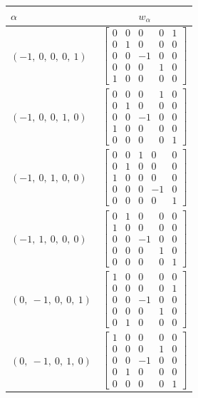 \documentclass[11pt]{article}
\newcommand{\noi}{\noindent}
\theoremstyle{definition}
\begin{document}
\noi \noindent \begin{longtable}{|l|c|}
    \hline
    $\alpha$ & $w_\alpha$ \\
    \hline
    \endhead
    $\left( -1, \  0, \  0, \  0, \  1\right)$ & ${\left[\begin{matrix}0 & 0 & 0 & 0 & 1\\0 & 1 & 0 & 0 & 0\\0 & 0 & -1 & 0 & 0\\0 & 0 & 0 & 1 & 0\\1 & 0 & 0 & 0 & 0\end{matrix}\right]}$ \\
    \hline
    $\left( -1, \  0, \  0, \  1, \  0\right)$ & ${\left[\begin{matrix}0 & 0 & 0 & 1 & 0\\0 & 1 & 0 & 0 & 0\\0 & 0 & -1 & 0 & 0\\1 & 0 & 0 & 0 & 0\\0 & 0 & 0 & 0 & 1\end{matrix}\right]}$ \\
    \hline
    $\left( -1, \  0, \  1, \  0, \  0\right)$ & ${\left[\begin{matrix}0 & 0 & 1 & 0 & 0\\0 & 1 & 0 & 0 & 0\\1 & 0 & 0 & 0 & 0\\0 & 0 & 0 & -1 & 0\\0 & 0 & 0 & 0 & 1\end{matrix}\right]}$ \\
    \hline
    $\left( -1, \  1, \  0, \  0, \  0\right)$ & ${\left[\begin{matrix}0 & 1 & 0 & 0 & 0\\1 & 0 & 0 & 0 & 0\\0 & 0 & -1 & 0 & 0\\0 & 0 & 0 & 1 & 0\\0 & 0 & 0 & 0 & 1\end{matrix}\right]}$ \\
    \hline
    $\left( 0, \  -1, \  0, \  0, \  1\right)$ & ${\left[\begin{matrix}1 & 0 & 0 & 0 & 0\\0 & 0 & 0 & 0 & 1\\0 & 0 & -1 & 0 & 0\\0 & 0 & 0 & 1 & 0\\0 & 1 & 0 & 0 & 0\end{matrix}\right]}$ \\
    \hline
    $\left( 0, \  -1, \  0, \  1, \  0\right)$ & ${\left[\begin{matrix}1 & 0 & 0 & 0 & 0\\0 & 0 & 0 & 1 & 0\\0 & 0 & -1 & 0 & 0\\0 & 1 & 0 & 0 & 0\\0 & 0 & 0 & 0 & 1\end{matrix}\right]}$ \\

\end{longtable}
\end{document}
